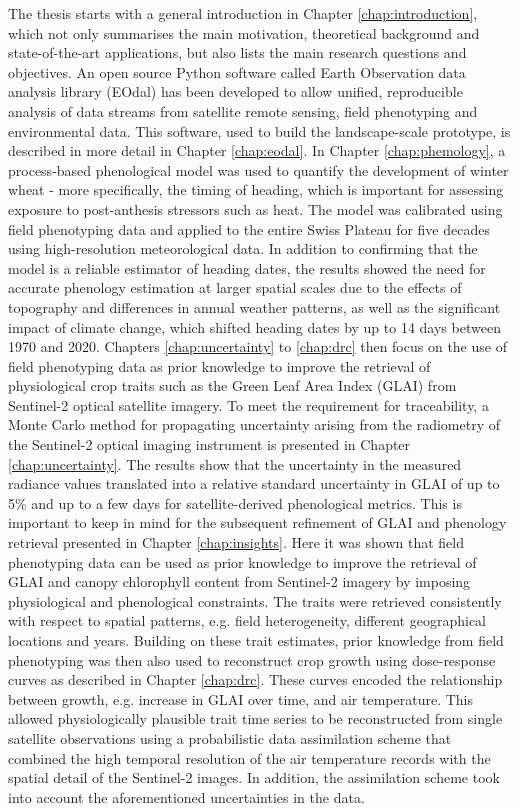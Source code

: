 The thesis starts with a general introduction in Chapter \ref{chap:introduction}, which not only summarises the main motivation, theoretical background and state-of-the-art applications, but also lists the main research questions and objectives.
An open source Python software called Earth Observation data analysis library (EOdal) has been developed to allow unified, reproducible analysis of data streams from satellite remote sensing, field phenotyping and environmental data. This software, used to build the landscape-scale prototype, is described in more detail in Chapter \ref{chap:eodal}.
In Chapter \ref{chap:phemology}, a process-based phenological model was used to quantify the development of winter wheat - more specifically, the timing of heading, which is important for assessing exposure to post-anthesis stressors such as heat. The model was calibrated using field phenotyping data and applied to the entire Swiss Plateau for five decades using high-resolution meteorological data. In addition to confirming that the model is a reliable estimator of heading dates, the results showed the need for accurate phenology estimation at larger spatial scales due to the effects of topography and differences in annual weather patterns, as well as the significant impact of climate change, which shifted heading dates by up to 14 days between 1970 and 2020.
Chapters \ref{chap:uncertainty} to \ref{chap:drc} then focus on the use of field phenotyping data as prior knowledge to improve the retrieval of physiological crop traits such as the Green Leaf Area Index (GLAI) from Sentinel-2 optical satellite imagery. To meet the requirement for traceability, a Monte Carlo method for propagating uncertainty arising from the radiometry of the Sentinel-2 optical imaging instrument is presented in Chapter \ref{chap:uncertainty}. The results show that the uncertainty in the measured radiance values translated into a relative standard uncertainty in GLAI of up to 5\% and up to a few days for satellite-derived phenological metrics. This is important to keep in mind for the subsequent refinement of GLAI and phenology retrieval presented in Chapter \ref{chap:insights}. Here it was shown that field phenotyping data can be used as prior knowledge to improve the retrieval of GLAI and canopy chlorophyll content from Sentinel-2 imagery by imposing physiological and phenological constraints. The traits were retrieved consistently with respect to spatial patterns, e.g. field heterogeneity, different geographical locations and years. Building on these trait estimates, prior knowledge from field phenotyping was then also used to reconstruct crop growth using dose-response curves as described in Chapter \ref{chap:drc}. These curves encoded the relationship between growth, e.g. increase in GLAI over time, and air temperature. This allowed physiologically plausible trait time series to be reconstructed from single satellite observations using a probabilistic data assimilation scheme that combined the high temporal resolution of the air temperature records with the spatial detail of the Sentinel-2 images. In addition, the assimilation scheme took into account the aforementioned uncertainties in the data.
